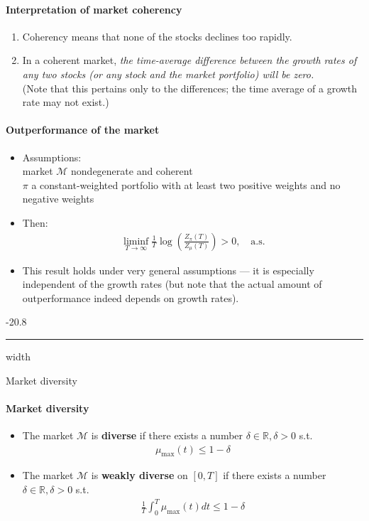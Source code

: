 \documentclass[a4paper,landscape,8pt,fleqn]{scrartcl}
\makeatletter
\renewcommand{\emph}[1]{\textbf{#1}}
\renewcommand{\subsubsection}{\@startsection{subsubsection}{1}{0mm}%
{-2\baselineskip}{0.8\baselineskip}%
{\hrule depth 0.2pt width\columnwidth\vspace*{1.2em}\normalsize\bfseries}}
\makeatother
\begin{document}
\begin{multicols*}{3}
\paragraph{Interpretation of market coherency}

\begin{enumerate}
\item Coherency means that none of the stocks declines too rapidly.
\item In a coherent market, \textit{the time-average difference between the growth rates of any two stocks (or any stock and the market portfolio) will be zero.} \\
(Note that this pertains only to the differences; the time average of a growth rate may not exist.)
\end{enumerate}

\paragraph{Outperformance of the market}

\begin{itemize}
\item Assumptions: \\
market $\mathcal{M}$ nondegenerate and coherent \\
$\pi$ a constant-weighted portfolio with at least two positive weights and no negative weights
\item Then:
\begin{align*}
\liminf_{T \to \infty} \frac{1}{T} \log \left( \frac{Z_\pi(T)}{Z_\mu(T)} \right) > 0, \quad \text{a.s.}
\end{align*}
\item This result holds under very general assumptions --- it is especially independent of the growth rates (but note that the actual amount of outperformance indeed depends on growth rates).
\end{itemize}

\subsubsection{Market diversity}

\paragraph{Market diversity}

\begin{itemize}
\item The market $\mathcal{M}$ is \emph{diverse} if there exists a number $\delta \in \mathbb{R}, \delta > 0$ s.t.
\begin{align*}
\mu_\text{max}(t) \leq 1 - \delta
\end{align*}
\item  The market $\mathcal{M}$ is \emph{weakly diverse} on $[0,T]$ if there exists a number $\delta \in \mathbb{R}, \delta > 0$ s.t.
\begin{align*}
\frac{1}{T} \int_0^T \mu_\text{max}(t) dt \leq 1 - \delta
\end{align*}
\end{itemize}


\end{multicols*}
\end{document}
